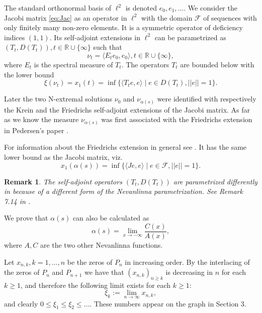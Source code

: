 \documentclass[12pt]{article}
\newtheorem{rem}[thm]{Remark}
\newcommand{\R}{\mathbb{R}}
\def\R{\mathbb{R}}
\begin{document}
The standard orthonormal basis of $\ell^2$ is denoted $e_0, e_1,\ldots$. 
We consider the Jacobi matrix \eqref{eq:Jac} as an operator in $\ell^2$ with the domain
$\mathcal F$ of sequences with only finitely many non-zero elements. 
It is a symmetric operator of deficiency indices $(1,1)$. Its self-adjoint extensions in $\ell^2$ can be parametrized as $(T_t, D(T_t)), t\in\R\cup\{\infty\}$ such that
\begin{equation}\label{eq:Ne4}
\nu_t=\langle E_t e_0, e_0\rangle, t\in\R\cup\{\infty\},
\end{equation}
where $E_t$ is the spectral measure of $T_t$. The operators $T_t$ are bounded below with the lower bound
\begin{equation}\label{eq:Ne5}
\xi(\nu_t)=x_1(t)=\inf\{\langle T_t e,e\rangle \mid e\in D(T_t), ||e||=1\}.
\end{equation}
 
Later the two N-extremal solutions
 $\nu_0$ and $\nu_{\alpha(s)}$ were identified with respectively the Krein and the Friedrichs self-adjoint extensions of the Jacobi matrix. As far as we know the measure $\nu_{\alpha(s)}$ was first associated with the  Friedrichs extension
in Pedersen's paper \cite{Pe1}.

For information  about the Friedrichs extension in general see \cite{GKP}. It has the same lower bound as the Jacobi matrix, viz.
$$
x_1(\alpha(s))=\inf\{\langle Je, e\rangle \mid e\in\mathcal F, ||e||=1\}.
$$
 
 \begin{rem}{\rm The self-adjoint operators $(T_t, D(T_t))$ are parametrized differently in \cite[Theorem 6.23]{Sch} because of a different form of the Nevanlinna parametrization. See Remark 7.14 in \cite{Sch}.
 }
 \end{rem}
 
 We prove that $\alpha(s)$ can also be calculated as
 $$
 \alpha(s)=\lim_{x\to -\infty}\frac{C(x)}{A(x)},
 $$
 where $A,C$ are the two other Nevanlinna functions.
 
 Let $x_{n,k}, k=1,\dots,n$ be the zeros of $P_n$ in increasing order. By the interlacing of the zeros of $P_n$ and $P_{n+1}$ we have that $(x_{n,k})_{n\ge k}$ is decreasing in $n$ for each $k\ge 1$, and therefore the following limit exists for each $k\ge 1$:
\begin{equation}\label{eq:xik}
\xi_k:=\lim_{n\to\infty}x_{n,k},
\end{equation} 
and clearly $0\le \xi_1\le \xi_2\le\ldots$. These numbers appear on the graph in Section 3.
\end{document}
